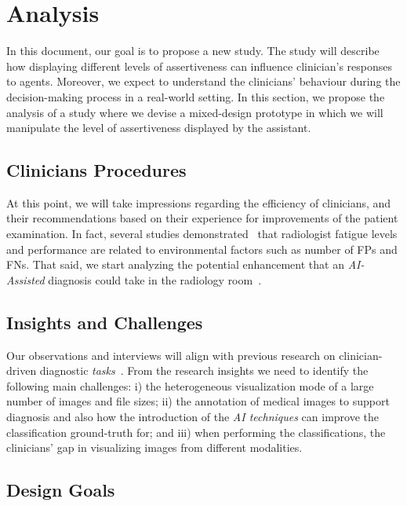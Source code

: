 \section{Analysis}
\label{sec:sec003}

In this document, our goal is to propose a new study.
The study will describe how displaying different levels of assertiveness can influence clinician's responses to agents.
Moreover, we expect to understand the clinicians' behaviour during the decision-making process in a real-world setting.
In this section, we propose the analysis of a study where we devise a mixed-design prototype in which we will manipulate the level of assertiveness displayed by the assistant.

\subsection{Clinicians Procedures}
\label{sec:sec00301}

At this point, we will take impressions regarding the efficiency of clinicians, and their recommendations based on their experience for improvements of the patient examination.
In fact, several studies demonstrated~\cite{waite2017tired} that radiologist fatigue levels and performance are related to environmental factors such as number of FPs and FNs.
That said, we start analyzing the potential enhancement that an {\it AI-Assisted} diagnosis could take in the radiology room~\cite{chatelain2018evaluation, miglioretti2007radiologist}.

\subsection{Insights and Challenges}
\label{sec:sec00302}

Our observations and interviews will align with previous research on clinician-driven diagnostic {\it tasks}~\cite{Sultanum:2018:MTP:3173574.3173996}.
From the research insights we need to identify the following main challenges:
i) the heterogeneous visualization mode of a large number of images and file sizes;
ii) the annotation of medical images to support diagnosis and also 
how the introduction of the {\it AI techniques} can improve the classification ground-truth for; and
iii) when performing the classifications, the clinicians' gap in visualizing images from different modalities.

\subsection{Design Goals}
\label{sec:sec00303}

